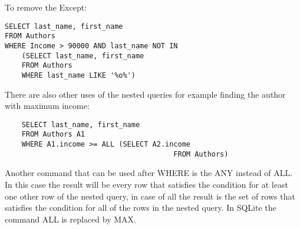 \documentclass[a4page, 11pt]{article}
\begin{document}
To remove the Except:
\begin{lstlisting}
SELECT last_name, first_name
FROM Authors
WHERE Income > 90000 AND last_name NOT IN 
	(SELECT last_name, first_name
	FROM Authors
	WHERE last_name LIKE '%o%')
\end{lstlisting}
There are also other uses of the nested queries for example finding the author with maximum income:
\begin{lstlisting}
	SELECT last_name, first_name
	FROM Authors A1
	WHERE A1.income >= ALL (SELECT A2.income
										FROM Authors)
\end{lstlisting}
Another command that can be used after WHERE is the ANY instead of ALL. In this case the result will be every row that satisfies the condition for at least one other row of the nested query, in case of all the result is the set of rows that satisfies the condition for all of the rows in the nested query. In SQLite the command ALL is replaced by MAX.
\end{document}
